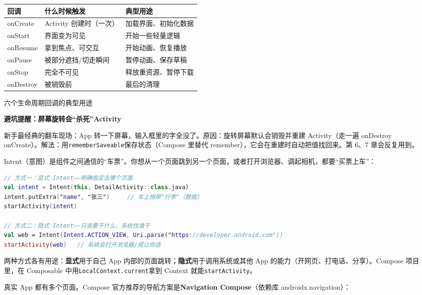 \begin{center}
\begin{tabularx}{\linewidth}{|X|X|X|}
\hline
\textbf{回调} & \textbf{什么时候触发} & \textbf{典型用途} \tabularnewline
\hline
onCreate & Activity 创建时（一次） & 加载界面、初始化数据 \tabularnewline
onStart & 界面变为可见 & 开始一些轻量逻辑 \tabularnewline
onResume & 拿到焦点、可交互 & 开始动画、恢复播放 \tabularnewline
onPause & 被部分遮挡/切走瞬间 & 暂停动画、保存草稿 \tabularnewline
onStop & 完全不可见 & 释放重资源、暂停下载 \tabularnewline
onDestroy & 被销毁前 & 最后的清理 \tabularnewline
\hline
\end{tabularx}
\end{center}

\begin{center}\small\color{gray}六个生命周期回调的典型用途\end{center}

\textbf{避坑提醒：屏幕旋转会“杀死”Activity}\par

新手最经典的翻车现场：App 转一下屏幕，输入框里的字全没了。原因：旋转屏幕默认会销毁并重建 Activity（走一遍 onDestroy onCreate）。解法：用\texttt{rememberSaveable}保存状态（Compose 里替代 remember），它会在重建时自动把值找回来。第 6、7 章会反复用到。


Intent（意图）是组件之间通信的“车票”。你想从一个页面跳到另一个页面，或者打开浏览器、调起相机，都要“买票上车”：

\begin{lstlisting}[language=Kotlin]
// 方式一：显式 Intent——明确指定去哪个页面
val intent = Intent(this, DetailActivity::class.java)
intent.putExtra("name", "张三")     // 车上捎带"行李"（数据）
startActivity(intent)

// 方式二：隐式 Intent——只说要干什么，系统找谁干
val web = Intent(Intent.ACTION_VIEW, Uri.parse("https://developer.android.com"))
startActivity(web)   // 系统会打开浏览器/或让你选
\end{lstlisting}

两种方式各有用途：\textbf{显式}用于自己 App 内部的页面跳转；\textbf{隐式}用于调用系统或其他 App 的能力（开网页、打电话、分享）。Compose 项目里，在 Composable 中用\texttt{LocalContext.current}拿到 Context 就能\texttt{startActivity}。


真实 App 都有多个页面。Compose 官方推荐的导航方案是\textbf{Navigation Compose}（依赖库 androidx.navigation）：

